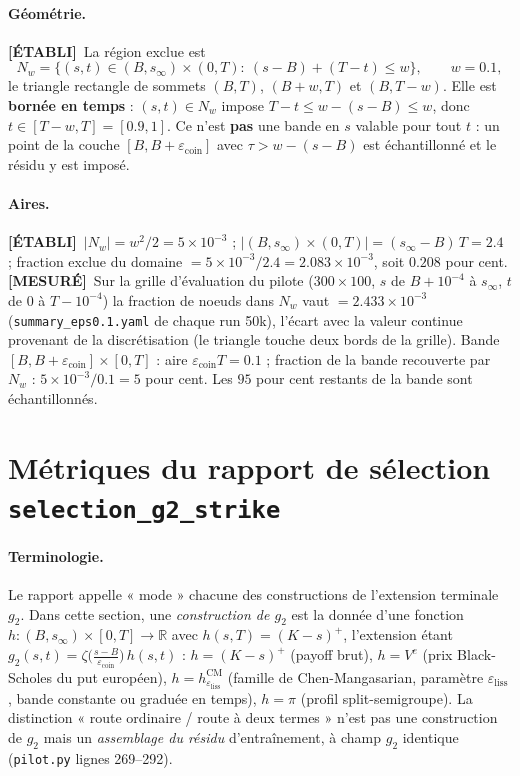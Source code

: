 \documentclass[11pt]{article}
\newcommand{\epscoin}{\varepsilon_{\mathrm{coin}}}
\newcommand{\epsliss}{\varepsilon_{\mathrm{liss}}}
\newcommand{\etabli}{\textbf{[ÉTABLI]}}
\newcommand{\mesure}{\textbf{[MESURÉ]}}
\newcommand{\code}[1]{\texttt{#1}}
\begin{document}
\paragraph{Géométrie.} \etabli\ La région exclue est
\[
N_w=\{(s,t)\in(B,s_\infty)\times(0,T):\ (s-B)+(T-t)\le w\},\qquad w=0.1,
\]
le triangle rectangle de sommets $(B,T)$, $(B+w,T)$ et $(B,T-w)$. Elle est
\textbf{bornée en temps} : $(s,t)\in N_w$ impose $T-t\le w-(s-B)\le w$, donc
$t\in[T-w,T]=[0.9,1]$. Ce n'est \textbf{pas} une bande en $s$ valable pour
tout $t$ : un point de la couche $[B,B+\epscoin]$ avec $\tau>w-(s-B)$ est
échantillonné et le résidu y est imposé.

\paragraph{Aires.} \etabli\ $|N_w|=w^2/2=5\times10^{-3}$ ;
$|(B,s_\infty)\times(0,T)|=(s_\infty-B)\,T=2.4$ ; fraction exclue du domaine
$=5\times10^{-3}/2.4=2.083\times10^{-3}$, soit $0.208$ pour cent.
\mesure\ Sur la grille d'évaluation du pilote ($300\times100$, $s$ de
$B+10^{-4}$ à $s_\infty$, $t$ de $0$ à $T-10^{-4}$) la fraction de noeuds
dans $N_w$ vaut  $=2.433\times10^{-3}$
(\code{summary\_eps0.1.yaml} de chaque run 50k), l'écart avec la valeur
continue provenant de la discrétisation (le triangle touche deux bords de la
grille). Bande $[B,B+\epscoin]\times[0,T]$ : aire $\epscoin T=0.1$ ; fraction
de la bande recouverte par $N_w$ : $5\times10^{-3}/0.1=5$ pour cent. Les
$95$ pour cent restants de la bande sont échantillonnés.

\section{Métriques du rapport de sélection \code{selection\_g2\_strike}}
\label{sec:metriques}

\paragraph{Terminologie.} Le rapport appelle « mode » chacune des
constructions de l'extension terminale $g_2$. Dans cette section, une
\emph{construction de $g_2$} est la donnée d'une fonction
$h:(B,s_\infty)\times[0,T]\to\mathbb R$ avec $h(s,T)=(K-s)^+$, l'extension
étant $g_2(s,t)=\zeta\big(\tfrac{s-B}{\epscoin}\big)\,h(s,t)$ : $h=(K-s)^+$
(payoff brut), $h=V^e$ (prix Black-Scholes du put européen),
$h=h^{\mathrm{CM}}_{\epsliss}$ (famille de Chen-Mangasarian, paramètre
$\epsliss$, bande constante ou graduée en temps), $h=\pi$ (profil
split-semigroupe). La distinction « route ordinaire / route à deux termes »
n'est pas une construction de $g_2$ mais un \emph{assemblage du résidu}
d'entraînement, à champ $g_2$ identique (\code{pilot.py} lignes 269--292).
\end{document}
